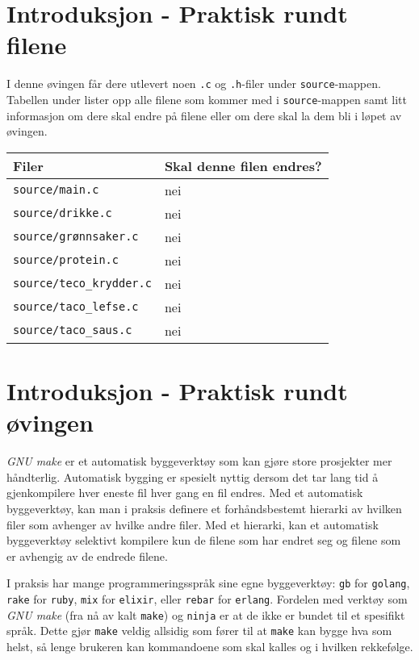 \begin{alphasection}

\section{Introduksjon - Praktisk rundt filene}

I denne øvingen får dere utlevert noen \verb|.c| og \verb|.h|-filer under \verb|source|-mappen. Tabellen under lister opp alle filene som kommer med i \verb|source|-mappen samt litt informasjon om dere skal endre på filene eller om dere skal la dem bli i løpet av øvingen.

\begin{center}
 \begin{tabular}{|p{8.5cm} p{5.5cm}|} 
 \hline
 \textbf{Filer} & \textbf{Skal denne filen endres?}  \\ [0.5ex] 
 \hline\hline
  \verb|source/main.c| & nei  \\ 
 \hline
 \verb|source/drikke.c| & nei  \\ 
 \hline
 \verb|source/grønnsaker.c| & nei  \\ 
 \hline
 \verb|source/protein.c| & nei  \\ 
 \hline
 \verb|source/teco_krydder.c| & nei  \\
 \hline
 \verb|source/taco_lefse.c| & nei  \\ 
 \hline
  \verb|source/taco_saus.c| & nei  \\ 
 \hline
\end{tabular}
\end{center}

\section{Introduksjon - Praktisk rundt øvingen}

 \textit{GNU make} er et automatisk byggeverktøy som kan gjøre store prosjekter mer håndterlig. Automatisk bygging er spesielt nyttig dersom det tar lang tid å gjenkompilere hver eneste fil hver gang en fil endres. Med et automatisk byggeverktøy, kan man i praksis definere et forhåndsbestemt hierarki av hvilken filer som avhenger av hvilke andre filer. Med et hierarki, kan et automatisk byggeverktøy selektivt kompilere kun de filene som har endret seg og filene som er avhengig av de endrede filene.
 
 I praksis har mange programmeringsspråk sine egne byggeverktøy: \verb|gb| for \verb|golang|, \verb|rake| for \verb|ruby|, \verb|mix| for \verb|elixir|, eller \verb|rebar| for \verb|erlang|. Fordelen med verktøy som \textit{GNU make} (fra nå av kalt \verb|make|) og \verb|ninja| er at de ikke er bundet til et spesifikt språk. Dette gjør \verb|make| veldig allsidig som fører til at \verb|make| kan bygge hva som helst, så lenge brukeren kan kommandoene som skal kalles og i hvilken rekkefølge.
 

\end{alphasection}
